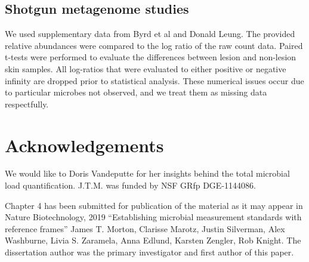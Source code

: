 \subsection{Shotgun metagenome studies}
We used supplementary data from Byrd et al \cite{Byrd2017-eb} and Donald Leung\cite{Leung-DYM}. The provided relative abundances were compared to the log ratio of the raw count data. Paired t-tests were performed to evaluate the differences between lesion and non-lesion skin samples.
All log-ratios that were evaluated to either positive or negative infinity are dropped prior to statistical analysis.
These numerical issues occur due to particular microbes not observed, and we treat them as missing data respectfully.

\section{Acknowledgements}
We would like to Doris Vandeputte for her insights behind the total microbial load quantification.
J.T.M. was funded by NSF GR\gls{fp} DGE-1144086.

Chapter 4 has been submitted for publication of the material as it may appear in
Nature Biotechnology, 2019 ``Establishing microbial measurement standards with reference frames''
James T. Morton,  Clarisse Marotz, Justin Silverman, Alex Washburne, Livia S. Zaramela,
Anna Edlund, Karsten Zengler, Rob Knight. The dissertation author was the primary investigator and first author of this paper.
